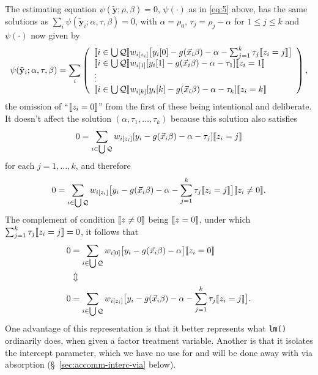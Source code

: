 \documentclass{article}
\DeclarePairedDelimiter{\indicator}{\llbracket}{\rrbracket}
\newcommand{\owt}[1][z_i]{\ensuremath{w_{i[#1]}}}
\begin{document}
The estimating equation $\psi(\tilde{\mathbf{y}}; \rho, \beta)=0$,
$\psi(\cdot)$ as in \eqref{eq:5} above, has the same solutions as $\sum_{i}\psi(\tilde{\mathbf{y}}_{i};
  \alpha, \tau, \beta)=0$, with $\alpha=\rho_{0}$, $\tau_{j}=\rho_{j}-\alpha$ for
$1\leq j \leq k$ and $\psi(\cdot)$ now given by 
\begin{equation} \label{eq:14}
         \psi(\tilde{\mathbf{y}}_{i};
  \alpha, \tau, \beta) =
         \sum_{i}\left( \begin{array}{l}
           \indicator{i \in \bigcup \mathcal{Q}}\owt{}\big[y_{i}[0] - g(\vec{x}_{i}\beta)-
                  \alpha - \sum_{j=1}^{k}\tau_{j}\indicator{z_{i}=j}\big]\\
           \indicator{i \in \bigcup \mathcal{Q}}\owt[1][y_{i}[1] - g(\vec{x}_{i}\beta)-
                  \alpha-\tau_{1}]\indicator{z_{i}=1}\\
                  \vdots \\
           \indicator{i \in \bigcup \mathcal{Q}}\owt[k][y_{i}[k] - g(\vec{x}_{i}\beta)-
                 \alpha - \tau_{k}]\indicator{z_{i}=k}\\
                \end{array}\right), 
\end{equation}
the omission of ``$\indicator{z_{i}=0}$'' from the first of these
being intentional and deliberate. It doesn't affect the solution
$(\alpha, \tau_{1}, \ldots, \tau_{k})$
because this solution also satisfies
\begin{equation*}
       0 = \sum_{i \in \bigcup \mathcal{Q}}\owt{}[y_{i} - g(\vec{x}_{i}\beta)-
                  \alpha-\tau_{j}]\indicator{z_{i}=j}
\end{equation*}
for each $j=1, \ldots, k$, and therefore
\begin{equation*}
       0 = \sum_{i \in \bigcup \mathcal{Q}}\owt{}\big[y_{i} - g(\vec{x}_{i}\beta)-
                  \alpha-\sum_{j=1}^{k}\tau_{j}\indicator{z_{i}=j}\big]\indicator{z_{i}
                  \neq 0}.
\end{equation*}
The complement of condition $\indicator{z\neq 0}$ being
$\indicator{z=0}$, under which $\sum_{j=1}^{k}\tau_{j}\indicator{z_{i}=j}=0$, it follows that
\begin{align*}
         0 &= \sum_{i \in \bigcup \mathcal{Q}}\owt[0]\big[y_{i} - g(\vec{x}_{i}\beta)-
                  \alpha\big]\indicator{z_{i}
             =0}\\
           & \Updownarrow \\
         0 &= \sum_{i \in \bigcup \mathcal{Q}}\owt{}\big[y_{i} - g(\vec{x}_{i}\beta)-
                  \alpha - \sum_{j=1}^{k}\tau_{j}\indicator{z_{i}=j}\big].
\end{align*}
One advantage of this representation is that it better represents what
\texttt{lm()} ordinarily does, when given a factor treatment
variable.  Another is that it isolates the intercept parameter, which
we have no use for and will be done away with via absorption (\S~\ref{sec:accomm-interc-via} below). 
\end{document}
